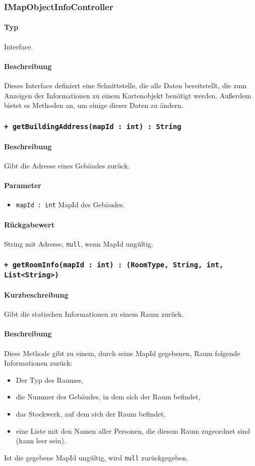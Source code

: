\subsubsection{IMapObjectInfoController}
\paragraph*{Typ}
Interface.
\paragraph*{Beschreibung}
Dieses Interface definiert eine Schnittstelle, die alle Daten bereitstellt, 
die zum Anzeigen der Informationen zu einem Kartenobjekt benötigt werden. 
Außerdem bietet es Methoden an, um einige dieser Daten zu ändern.

\subsubsection*{\texttt{+ getBuildingAddress(mapId : int) : String}}%
\paragraph*{Beschreibung}
Gibt die Adresse eines Gebäudes zurück.
\paragraph*{Parameter}
\begin{itemize}
    \item \texttt{mapId : int} MapId des Gebäudes.
\end{itemize}
\paragraph*{Rückgabewert}
String mit Adresse, \texttt{null}, wenn MapId ungültig.

\subsubsection*{\texttt{+ getRoomInfo(mapId : int) : (RoomType, String, int, List<String>)}}%
\paragraph*{Kurzbeschreibung}
Gibt die statischen Informationen zu einem Raum zurück.
\paragraph*{Beschreibung}
Diese Methode gibt zu einem, durch seine MapId gegebenen, Raum folgende Informationen zurück:
\begin{itemize}
    \item Der Typ des Raumes,
    \item die Nummer des Gebäudes, in dem sich der Raum befindet,
    \item das Stockwerk, auf dem sich der Raum befindet,
    \item eine Liste mit den Namen aller Personen, die diesem Raum zugeordnet sind (kann leer sein).
\end{itemize}
Ist die gegebene MapId ungültig, wird \texttt{null} zurückgegeben.
